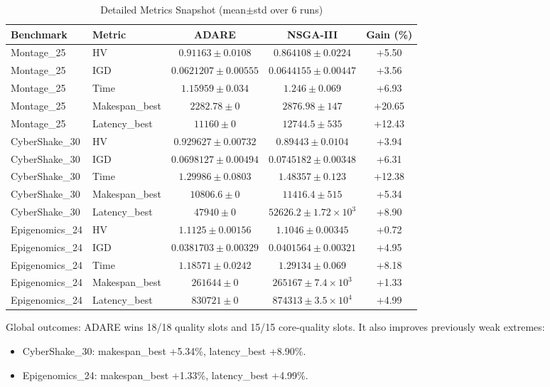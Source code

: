 \documentclass[conference]{IEEEtran}
\begin{document}
\begin{table}[htbp]
\centering
\caption{Detailed Metrics Snapshot (mean$\pm$std over 6 runs)}
\label{tab:detailed_snapshot}
\begin{tabular}{llccc}
\toprule
\textbf{Benchmark} & \textbf{Metric} & \textbf{ADARE} & \textbf{NSGA-III} & \textbf{Gain (\%)} \\
\midrule
Montage\_25 & HV & $0.91163\pm0.0108$ & $0.864108\pm0.0224$ & +5.50 \\
Montage\_25 & IGD & $0.0621207\pm0.00555$ & $0.0644155\pm0.00447$ & +3.56 \\
Montage\_25 & Time & $1.15959\pm0.034$ & $1.246\pm0.069$ & +6.93 \\
Montage\_25 & Makespan\_best & $2282.78\pm0$ & $2876.98\pm147$ & +20.65 \\
Montage\_25 & Latency\_best & $11160\pm0$ & $12744.5\pm535$ & +12.43 \\
\midrule
CyberShake\_30 & HV & $0.929627\pm0.00732$ & $0.89443\pm0.0104$ & +3.94 \\
CyberShake\_30 & IGD & $0.0698127\pm0.00494$ & $0.0745182\pm0.00348$ & +6.31 \\
CyberShake\_30 & Time & $1.29986\pm0.0803$ & $1.48357\pm0.123$ & +12.38 \\
CyberShake\_30 & Makespan\_best & $10806.6\pm0$ & $11416.4\pm515$ & +5.34 \\
CyberShake\_30 & Latency\_best & $47940\pm0$ & $52626.2\pm1.72\times10^3$ & +8.90 \\
\midrule
Epigenomics\_24 & HV & $1.1125\pm0.00156$ & $1.1046\pm0.00345$ & +0.72 \\
Epigenomics\_24 & IGD & $0.0381703\pm0.00329$ & $0.0401564\pm0.00321$ & +4.95 \\
Epigenomics\_24 & Time & $1.18571\pm0.0242$ & $1.29134\pm0.069$ & +8.18 \\
Epigenomics\_24 & Makespan\_best & $261644\pm0$ & $265167\pm7.4\times10^3$ & +1.33 \\
Epigenomics\_24 & Latency\_best & $830721\pm0$ & $874313\pm3.5\times10^4$ & +4.99 \\
\bottomrule
\end{tabular}
\end{table}

Global outcomes: ADARE wins 18/18 quality slots and 15/15 core-quality slots. It also improves previously weak extremes:
\begin{itemize}
    \item CyberShake\_30: makespan\_best +5.34\%, latency\_best +8.90\%.
    \item Epigenomics\_24: makespan\_best +1.33\%, latency\_best +4.99\%.
\end{itemize}
\end{document}
